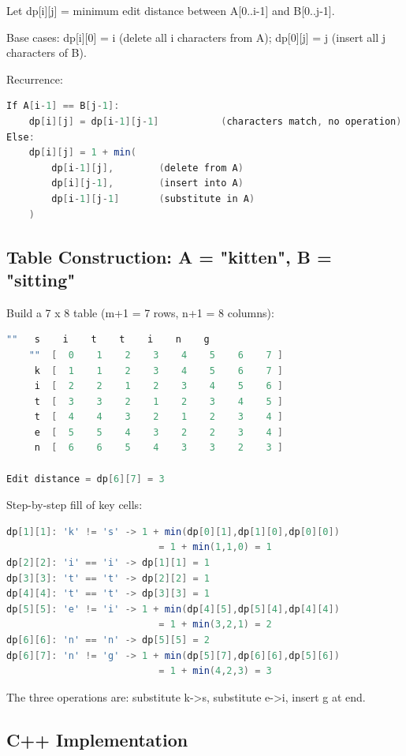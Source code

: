 Let dp[i][j] = minimum edit distance between A[0..i-1] and B[0..j-1].

Base cases: dp[i][0] = i (delete all i characters from A); dp[0][j] = j (insert all j characters of B).

Recurrence:

\begin{lstlisting}[language=Java]
If A[i-1] == B[j-1]:
    dp[i][j] = dp[i-1][j-1]           (characters match, no operation)
Else:
    dp[i][j] = 1 + min(
        dp[i-1][j],        (delete from A)
        dp[i][j-1],        (insert into A)
        dp[i-1][j-1]       (substitute in A)
    )
\end{lstlisting}

\subsection{Table Construction: A = "kitten", B = "sitting"}

Build a 7 x 8 table (m+1 = 7 rows, n+1 = 8 columns):

\begin{lstlisting}[language=Java]
          ""   s    i    t    t    i    n    g
    ""  [  0    1    2    3    4    5    6    7 ]
     k  [  1    1    2    3    4    5    6    7 ]
     i  [  2    2    1    2    3    4    5    6 ]
     t  [  3    3    2    1    2    3    4    5 ]
     t  [  4    4    3    2    1    2    3    4 ]
     e  [  5    5    4    3    2    2    3    4 ]
     n  [  6    6    5    4    3    3    2    3 ]

Edit distance = dp[6][7] = 3
\end{lstlisting}

Step-by-step fill of key cells:

\begin{lstlisting}[language=Java]
dp[1][1]: 'k' != 's' -> 1 + min(dp[0][1],dp[1][0],dp[0][0])
                           = 1 + min(1,1,0) = 1
dp[2][2]: 'i' == 'i' -> dp[1][1] = 1
dp[3][3]: 't' == 't' -> dp[2][2] = 1
dp[4][4]: 't' == 't' -> dp[3][3] = 1
dp[5][5]: 'e' != 'i' -> 1 + min(dp[4][5],dp[5][4],dp[4][4])
                           = 1 + min(3,2,1) = 2
dp[6][6]: 'n' == 'n' -> dp[5][5] = 2
dp[6][7]: 'n' != 'g' -> 1 + min(dp[5][7],dp[6][6],dp[5][6])
                           = 1 + min(4,2,3) = 3
\end{lstlisting}

The three operations are: substitute k->s, substitute e->i, insert g at end.

\subsection{C++ Implementation}


